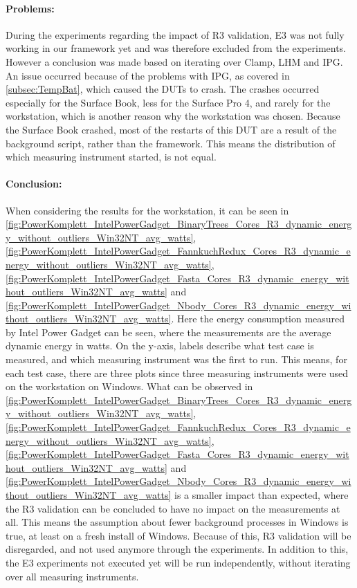 \paragraph{Problems:} During the experiments regarding the impact of R3 validation, E3 was not fully working in our framework yet and was therefore excluded from the experiments. However a conclusion was made based on iterating over Clamp, LHM and IPG. An issue occurred because of the problems with IPG, as covered in \cref{subsec:TempBat}, which caused the DUTs to crash. The crashes occurred especially for the Surface Book, less for the Surface Pro 4, and rarely for the workstation, which is another reason why the workstation was chosen. Because the Surface Book crashed, most of the restarts of this DUT are a result of the background script, rather than the framework. This means the distribution of which measuring instrument started, is not equal.

\paragraph{Conclusion:} When considering the results for the workstation, it can be seen in \cref{fig:PowerKomplett_IntelPowerGadget_BinaryTrees_Cores_R3_dynamic_energy_without_outliers_Win32NT_avg_watts}, \cref{fig:PowerKomplett_IntelPowerGadget_FannkuchRedux_Cores_R3_dynamic_energy_without_outliers_Win32NT_avg_watts}, \cref{fig:PowerKomplett_IntelPowerGadget_Fasta_Cores_R3_dynamic_energy_without_outliers_Win32NT_avg_watts} and \cref{fig:PowerKomplett_IntelPowerGadget_Nbody_Cores_R3_dynamic_energy_without_outliers_Win32NT_avg_watts}. Here the energy consumption measured by Intel Power Gadget can be seen, where the measurements are the average dynamic energy in watts. On the y-axis, labels describe what test case is measured, and which measuring instrument was the first to run. This means, for each test case, there are three plots since three measuring instruments were used on the workstation on Windows. What can be observed in \cref{fig:PowerKomplett_IntelPowerGadget_BinaryTrees_Cores_R3_dynamic_energy_without_outliers_Win32NT_avg_watts}, \cref{fig:PowerKomplett_IntelPowerGadget_FannkuchRedux_Cores_R3_dynamic_energy_without_outliers_Win32NT_avg_watts}, \cref{fig:PowerKomplett_IntelPowerGadget_Fasta_Cores_R3_dynamic_energy_without_outliers_Win32NT_avg_watts} and \cref{fig:PowerKomplett_IntelPowerGadget_Nbody_Cores_R3_dynamic_energy_without_outliers_Win32NT_avg_watts} is a smaller impact than expected, where the R3 validation can be concluded to have no impact on the measurements at all. This means the assumption about fewer background processes in Windows is true, at least on a fresh install of Windows. Because of this, R3 validation will be disregarded, and not used anymore through the experiments. In addition to this, the E3 experiments not executed yet will be run independently, without iterating over all measuring instruments.
